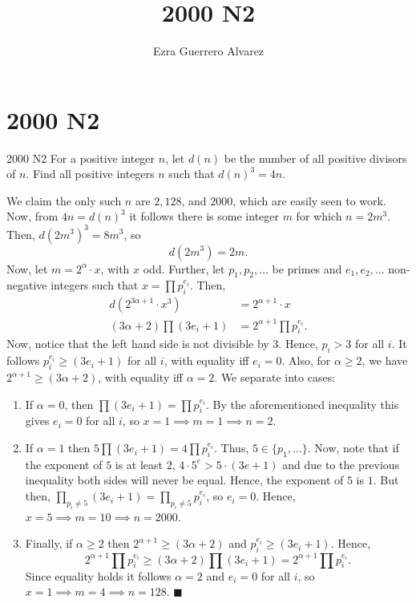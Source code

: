 \documentclass[14pt]{article}
\title{2000 N2}
\author{Ezra Guerrero Alvarez}
\begin{document}
\maketitle
	
\section*{2000 N2}

\begin{statement}{2000 N2}
	For a positive integer $n$, let $d(n)$ be the number of all positive divisors of $n$. Find all positive integers $n$ such that $d(n)^3=4n$.
\end{statement}
We claim the only such $n$ are $2,128$, and $2000$, which are easily seen to work. Now, from $4n=d(n)^3$ it follows there is some integer $m$ for which $n=2m^3$. Then, $d(2m^3)^3=8m^3$, so
\[ d(2m^3)=2m. \]
Now, let $m=2^\alpha\cdot x$, with $x$ odd. Further, let $p_1,p_2,\ldots$ be primes and $e_1,e_2,\ldots$ non-negative integers such that $x=\prod p_i^{e_i}$. Then,
\begin{align*}
	d(2^{3\alpha+1}\cdot x^3)&=2^{\alpha+1}\cdot x\\
	(3\alpha+2)\prod(3e_i+1)&=2^{\alpha+1}\prod p_i^{e_i}.
\end{align*}
Now, notice that the left hand side is not divisible by $3$. Hence, $p_i>3$ for all $i$. It follows $p_i^{e_i}\ge(3e_i+1)$ for all $i$, with equality iff $e_i=0$. Also, for $\alpha\ge2$, we have $2^{\alpha+1}\ge(3\alpha+2)$, with equality iff $\alpha=2$. We separate into cases:
\begin{enumerate}
	\item If $\alpha=0$, then $\prod(3e_i+1)=\prod p_i^{e_i}$. By the aforementioned inequality this gives $e_i=0$ for all $i$, so $x=1\implies m=1\implies \boxed{n=2}$.
	\item If $\alpha=1$ then $5\prod(3e_i+1)=4\prod p_i^{e_i}$. Thus, $5\in\{p_1,\ldots\}$. Now, note that if the exponent of $5$ is at least $2$, $4\cdot 5^e>5\cdot(3e+1)$ and due to the previous inequality both sides will never be equal. Hence, the exponent of $5$ is $1$. But then, $\prod_{p_i\ne 5}(3e_i+1)=\prod_{p_i\ne 5}p_i^{e_i}$, so $e_i=0$. Hence, $x=5\implies m=10\implies \boxed{n=2000}$.
	\item Finally, if $\alpha\ge2$ then $2^{\alpha+1}\ge(3\alpha+2)$ and $p_i^{e_i}\ge(3e_i+1)$. Hence, 
	\[ 2^{\alpha+1}\prod p_i^{e_i}\ge(3\alpha+2)\prod(3e_i+1)=2^{\alpha+1}\prod p_i^{e_i}.  \]
	Since equality holds it follows $\alpha=2$ and $e_i=0$ for all $i$, so $x=1\implies m=4\implies \boxed{n=128}$. $\blacksquare$
\end{enumerate}
	
\end{document}
